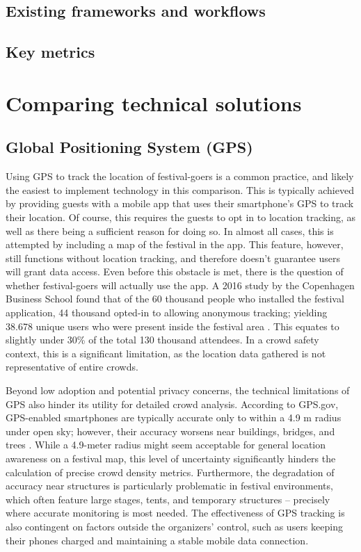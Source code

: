\subsection{Existing frameworks and workflows}

\subsection{Key metrics}



\section{Comparing technical solutions}

\subsection{Global Positioning System (GPS)}

Using GPS to track the location of festival-goers is a common practice, and likely the easiest to implement technology in this comparison. This is typically achieved by providing guests with a mobile app that uses their smartphone's GPS to track their location. Of course, this requires the guests to opt in to location tracking, as well as there being a sufficient reason for doing so. In almost all cases, this is attempted by including a map of the festival in the app. This feature, however, still functions without location tracking, and therefore doesn't guarantee users will grant data access. Even before this obstacle is met, there is the question of whether festival-goers will actually use the app. A 2016 study by the Copenhagen Business School found that of the 60 thousand people who installed the festival application, 44 thousand opted-in to allowing anonymous tracking; yielding 38.678 unique users who were present inside the festival area \cite{rf_app}. This equates to slightly under 30\% of the total 130 thousand attendees. In a crowd safety context, this is a significant limitation, as the location data gathered is not representative of entire crowds.

Beyond low adoption and potential privacy concerns, the technical limitations of GPS also hinder its utility for detailed crowd analysis. According to GPS.gov, GPS-enabled smartphones are typically accurate only to within a 4.9 m radius under open sky; however, their accuracy worsens near buildings, bridges, and trees \cite{gps}. While a 4.9-meter radius might seem acceptable for general location awareness on a festival map, this level of uncertainty significantly hinders the calculation of precise crowd density metrics. Furthermore, the degradation of accuracy near structures is particularly problematic in festival environments, which often feature large stages, tents, and temporary structures -- precisely where accurate monitoring is most needed. The effectiveness of GPS tracking is also contingent on factors outside the organizers' control, such as users keeping their phones charged and maintaining a stable mobile data connection.

